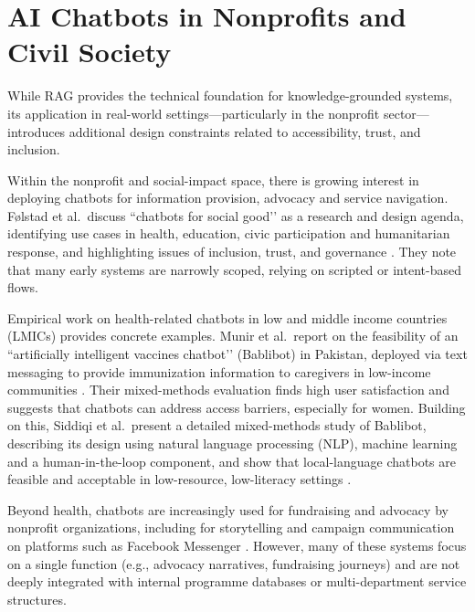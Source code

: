 \section{AI Chatbots in Nonprofits and Civil Society}
While RAG provides the technical foundation for knowledge-grounded systems, its application in real-world settings—particularly in the nonprofit sector—introduces additional design constraints related to accessibility, trust, and inclusion. 

Within the nonprofit and social-impact space, there is growing interest in deploying chatbots for information provision, advocacy and service navigation. Følstad et al.\ discuss “chatbots for social good’’ as a research and design agenda, identifying use cases in health, education, civic participation and humanitarian response, and highlighting issues of inclusion, trust, and governance \cite{folstad2018socialgood}. They note that many early systems are narrowly scoped, relying on scripted or intent-based flows.

Empirical work on health-related chatbots in low and middle income countries (LMICs) provides concrete examples. Munir et al.\ report on the feasibility of an “artificially intelligent vaccines chatbot’’ (Bablibot) in Pakistan, deployed via text messaging to provide immunization information to caregivers in low-income communities \cite{munir2021bablibot}. Their mixed-methods evaluation finds high user satisfaction and suggests that chatbots can address access barriers, especially for women. Building on this, Siddiqi et al.\ present a detailed mixed-methods study of Bablibot, describing its design using natural language processing (NLP), machine learning and a human-in-the-loop component, and show that local-language chatbots are feasible and acceptable in low-resource, low-literacy settings \cite{siddiqi2024bablibot}.

Beyond health, chatbots are increasingly used for fundraising and advocacy by nonprofit organizations, including for storytelling and campaign communication on platforms such as Facebook Messenger \cite{halperin2023storytelling}. However, many of these systems focus on a single function (e.g., advocacy narratives, fundraising journeys) and are not deeply integrated with internal programme databases or multi-department service structures.


